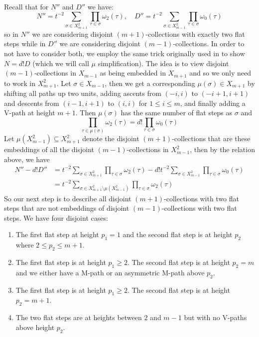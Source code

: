 \documentclass[11pt]{article}
\theoremstyle{definition}
\theoremstyle{definition}
\theoremstyle{plain}
\theoremstyle{plain}
\theoremstyle{plain}
\theoremstyle{definition}
\begin{document}
Recall that for $N''$ and $D''$ we have:
\begin{equation*}
N'' = t^{-2}\sum\limits_{\sigma\in X_{m+1}^2}\prod\limits_{\tau\in\sigma}\omega_2(\tau),\quad D'' = t^{-2}\sum\limits_{\sigma\in X_{m-1}^2}\prod\limits_{\tau\in\sigma}\omega_0(\tau)
\end{equation*}
so in $N''$ we are considering disjoint $(m+1)$-collections with exactly two flat steps while in $D''$ we are considering disjoint $(m-1)$-collections. In order to not have to consider both, we employ the same trick originally used in \cite{willerton_magnitude_2017} to show $N = d!D$ (which we will call $\mu$ simplification). The idea is to view disjoint $(m-1)$-collections in $X_{m-1}$ as being embedded in $X_{m+1}$ and so we only need to work in $X_{m+1}^2$. Let $\sigma \in X_{m-1}$, then we get a corresponding $\mu(\sigma)\in X_{m+1}$ by shifting all paths up two units, adding ascents from $(-i,i)$ to $(-i+1,i+1)$ and descents from $(i-1,i+1)$ to $(i,i)$ for $1\leq i \leq m$, and finally adding a V-path at height $m+1$. Then $\mu(\sigma)$ has the same number of flat steps as $\sigma$ and
\begin{equation*}
\prod\limits_{\tau\in\mu(\sigma)}\omega_2(\tau) = d!\prod\limits_{\tau\in\sigma}\omega_0(\tau)
\end{equation*}
Let $\mu(X_{m-1}^2)\subseteq X_{m+1}^2$ denote the disjoint $(m+1)$-collections that are these embeddings of all the disjoint $(m-1)$-collections in $X_{m-1}^2$, then by the relation above, we have
\begin{align*}
N''-d!D'' &= t^{-2}\sum\limits_{\sigma\in X_{m+1}^2}\prod\limits_{\tau\in\sigma}\omega_2(\tau) - d!t^{-2}\sum\limits_{\sigma\in X_{m-1}^2}\prod\limits_{\tau\in\sigma}\omega_0(\tau) \\
&= t^{-2}\sum\limits_{\sigma\in X_{m+1}^2\setminus\mu(X_{m-1}^2)}\prod\limits_{\tau\in\sigma}\omega_2(\tau)
\end{align*}
So our next step is to describe all disjoint $(m+1)$-collections with two flat steps that are not embeddings of disjoint $(m-1)$-collections with two flat steps. We have four disjoint cases:
\begin{enumerate}
\item The first flat step at height $p_1=1$ and the second flat step is at height $p_2$ where $2\leq p_2\leq m+1$.
\item The first flat step is at height $p_1 \geq 2$. The second flat step is at height $p_2 = m$ and we either have a M-path or an asymmetric M-path above $p_2$.
\item The first flat step is at height $p_1 \geq 2$. The second flat step is at height $p_2 = m+1$.
\item The two flat steps are at heights between $2$ and $m-1$ but with no V-paths above height $p_2$.
\end{enumerate}
\end{document}
